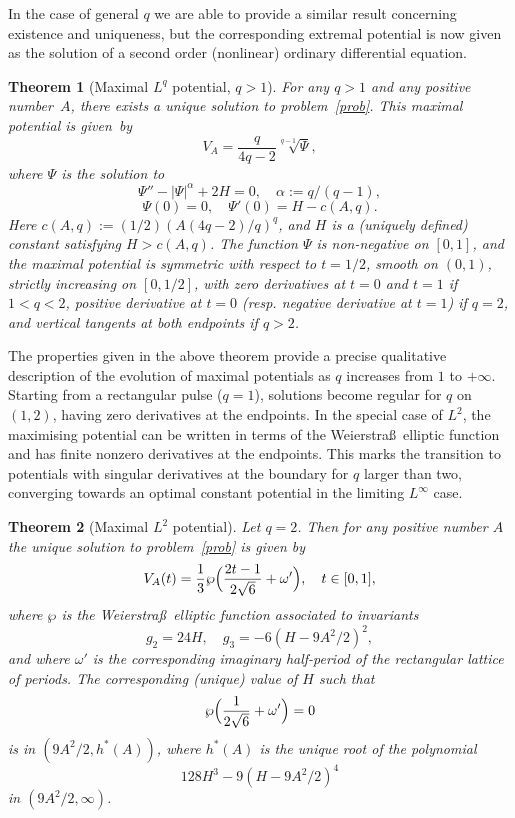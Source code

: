 \documentclass[11pt]{article}
\newcommand{\resp}{resp.\xspace}
\theoremstyle{plain}
\newtheorem{thmx}{Theorem}
\theoremstyle{definition}
\let\balpha q
\begin{document}
In the case of general $\balpha$ we are able to provide a similar result concerning existence and uniqueness, but the corresponding
extremal potential is now given as the solution of a second order (nonlinear) ordinary differential equation.

\begin{thmx}[Maximal $L^\balpha$ potential, $\balpha>1$] \label{thm2}
For any $\balpha>1$ and any positive number~$A$, there exists a unique solution to problem~\eqref{prob}.
This maximal potential is given~by
\[
V_{A} = \frac{\balpha}{4\balpha-2}\sqrt[\balpha-1]{\Psi},
\]
where $\Psi$ is the solution to
\[
\Psi''-|\Psi|^\alpha+2H = 0,\quad \alpha:=\balpha/(\balpha-1),
\]
\[
\Psi(0)=0,\quad \Psi'(0)=H-c(A,\balpha).
\]
Here $c(A,\balpha):=(1/2)(A(4\balpha-2)/\balpha)^\balpha$, and $H$ is a
(uniquely defined) constant satisfying $H>c(A,\balpha)$.
The function $\Psi$ is non-negative on $[0,1]$, and
the maximal potential is symmetric with respect to $t=1/2$, smooth on $(0,1)$,
strictly increasing on $[0,1/2]$,
with zero derivatives at $t=0$ and $t=1$ if $1<\balpha<2$, positive derivative at $t=0$
(\resp negative derivative at $t=1$) if $\balpha=2$, and vertical tangents at both
endpoints if $q>2$.
\end{thmx}

The properties given in the above theorem provide a precise qualitative description of the evolution of maximal potentials as
$q$ increases from $1$ to $+\infty$. Starting from a rectangular pulse ($q=1$), solutions become regular for $q$ on $(1,2)$, having
zero derivatives at the endpoints. In the special case of $L^{2}$, the maximising
potential can be written in terms of the Weierstra\ss\ elliptic function
and has finite nonzero derivatives at the endpoints. This marks the transition to potentials with singular derivatives at the boundary
for $\balpha$ larger than two, converging towards an optimal constant potential in the limiting $L^{\infty}$ case.

\begin{thmx}[Maximal $L^2$ potential] \label{thm3}
Let $\balpha=2$. Then for any positive number $A$ the unique solution to problem~\eqref{prob}
is given by
\[
V_A(t) = \frac{1}{3}\wp\Bigl(\frac{2t-1}{2\sqrt{6}}+\omega'\Bigr),\quad t \in [0,1],
\]
where $\wp$ is the Weierstra\ss\ elliptic function associated to invariants
\[
g_2 = 24 H,\quad g_3 = -6(H-9A^2/2)^2,
\]
and where $\omega'$ is the corresponding
imaginary half-period of the rectangular lattice of
periods. The corresponding (unique) value of $H$ such that
\[
\wp\Bigl(\frac{1}{2\sqrt{6}}+\omega'\Bigr) = 0
\]
is in $(9A^2/2,h^*(A))$, where $h^*(A)$ is the unique root of the polynomial
\[
128 H^3-9(H-9A^2/2)^4
\]
in $(9A^2/2,\infty)$.
\end{thmx}
\end{document}
